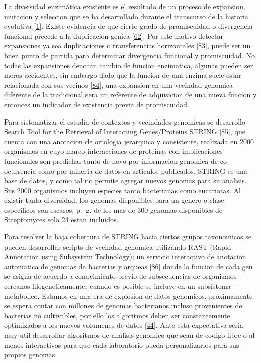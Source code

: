 \documentclass[12pt,twoside]{reedthesis}
\begin{document}
  La diversidad enzimática existente es el resultado de un proceso de
  expansion, mutacion y seleccion que se ha desarrollado durante el
  transcurso de la historia evolutiva
  {[}\protect\hyperlink{ref-khersonsky_enzyme_2010}{1}{]}. Existe
  evidencia de que cierto grado de promiscuidad o divergencia funcional
  precede a la duplicacion genica
  {[}\protect\hyperlink{ref-hughes_evolution_1994}{62}{]}. Por este motivo
  detectar expansiones ya sea duplicaciones o transferencias horizontales
  {[}\protect\hyperlink{ref-treangen_horizontal_2011}{83}{]}, puede ser un
  buen punto de partida para determinar divergencia funcional y
  promiscuidad. No todas las expansiones denotan cambio de funcion
  enzimatica, algunas pueden ser meros accidentes, sin embargo dado que la
  funcion de una enzima suele estar relacionada con sus vecinos
  {[}\protect\hyperlink{ref-overbeek_use_1999}{84}{]}, una expansion en
  una vecindad genomica diferente de la tradicional sera un referente de
  adquisicion de una nueva funcion y entonces un indicador de existencia
  previa de promiscuidad.
  
  Para sistematizar el estudio de contextos y vecindades genomicas se
  desarrollo Search Tool for the Retrieval of Interacting Genes/Proteins
  STRING {[}\protect\hyperlink{ref-snel_string_2000}{85}{]}, que cuenta
  con una anotacion de ortologia jerarquica y consistente, realizada en
  2000 organismos en cuyo marco interacciones de proteinas con
  implicaciones funcionales son predichas tanto de novo por informacion
  genomica de co-ocurrencia como por mineria de datos en articulos
  publicados. STRING es una base de datos, y como tal no permite agregar
  nuevos genomas para su analisis. Sus 2000 organismos incluyen especies
  tanto bacterianas como eucariotas. Al existir tanta diversidad, los
  genomas disponibles para un genero o clase especificos son escasos,
  p.~g. de los mas de 300 genomas disponibles de Streptomyces solo 24
  estan incluidos.
  
  Para resolver la baja cobertura de STRING hacia ciertos grupos
  taxonomicos se pueden desarrollar scripts de vecindad genomica
  utilizando RAST (Rapid Annotation using Subsystem Technology); un
  servicio interactivo de anotacion automatica de genomas de bacterias y
  arqueas {[}\protect\hyperlink{ref-aziz_rast_2008}{86}{]} donde la
  funcion de cada gen se asigna de acuerdo a conocimiento previo de
  subsecuencias de organismos cercanos filogeneticamente, cuando es
  posible se incluye en un subsistema metabolico. Estamos en una era de
  explosion de datos genomicos, proximamente se espera contar con millones
  de genomas bacterianos incluso provenientes de bacterias no cultivables,
  por ello los algoritmos deben ser constantemente optimizados a los
  nuevos volumenes de datos
  {[}\protect\hyperlink{ref-medema_computational_2015}{44}{]}. Ante esta
  expectativa seria muy util desarrollar algoritmos de analisis genomico
  que sean de codigo libre o al menos interactivos para que cada
  laboratorio pueda personalizarlos para sus propios genomas.
  
\end{document}
